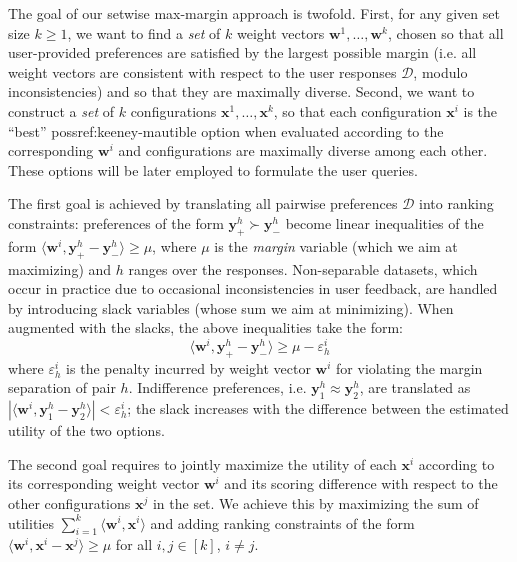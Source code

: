 \documentclass{article}
\renewcommand\[{\begin{equation}}
\renewcommand\]{\end{equation}}
\newcommand{\calvar}[1]{\ensuremath{\mathcal{#1}}}
\newcommand{\calD}{\calvar{D}}
\newcommand{\calX}{\calvar{X}}
\newcommand{\vecvar}[1]{\ensuremath{\boldsymbol{#1}}}
\newcommand{\vw}{\vecvar{w}}
\newcommand{\vx}{\vecvar{x}}
\newcommand{\vy}{\vecvar{y}}
\DeclareMathOperator*{\argmax}{argmax}
\begin{document}
The goal of our setwise max-margin approach is twofold. First, for any
given set size $k\geq 1$, we want to find a {\em set} of $k$ weight
vectors $\vw^{1}, \ldots, \vw^{k}$, chosen so that all user-provided
preferences are satisfied by the largest possible margin (i.e. all
weight vectors are consistent with respect to the user responses
$\calD$, modulo inconsistencies) and so that they are maximally
diverse.  Second, we want to construct a {\em set} of $k$
configurations $\vx^{1}, \ldots, \vx^{k}$, so that each configuration
$\vx^{i}$ is the ``best'' possref:keeney-mautible option when evaluated according to
the corresponding $\vw^{i}$ and configurations are maximally diverse
among each other. These options will be later employed to formulate
the user queries.

The first goal is achieved by translating all pairwise preferences
$\calD$ into ranking constraints: preferences of the form
$\vy^h_+ \succ \vy^h_-$ become linear inequalities of the form
$\langle \vw^i, \vy^h_+ - \vy^h_- \rangle \geq \mu$, where $\mu$ is the
{\em margin} variable (which we aim at maximizing) and $h$ ranges over
the responses.  Non-separable datasets, which occur in practice due to
occasional inconsistencies in user feedback, are handled by
introducing slack variables (whose sum we aim at minimizing). When
augmented with the slacks, the above inequalities take the form:
%
$$ \langle \vw^{i}, \vy^{h}_+ - \vy^{h}_- \rangle \ge \mu - \varepsilon^{i}_h $$
%
where $\varepsilon^{i}_h$ is the penalty incurred by weight vector $\vw^{i}$
for violating the margin separation of pair $h$. Indifference preferences, i.e.
$\vy^h_1 \approx \vy^h_2$, are translated as $|\langle \vw^i, \vy^h_1 - \vy^h_2 \rangle| < \varepsilon^i_h$;
the slack increases with the difference between the estimated utility of the
two options.

The second goal requires to jointly maximize the utility of each
$\vx^{i}$ according to its corresponding weight vector $\vw^i$ and its
scoring difference with respect to the other configurations $\vx^j$ in
the set. We achieve this by maximizing the sum of utilities
$\sum_{i=1}^k \langle \vw^{i}, \vx^{i} \rangle$ and adding ranking
constraints of the form
$\langle \vw^{i}, \vx^{i} - \vx^{j} \rangle \geq \mu$ for all
$i,j\in[k]$, $i \ne j$.


\end{document}

